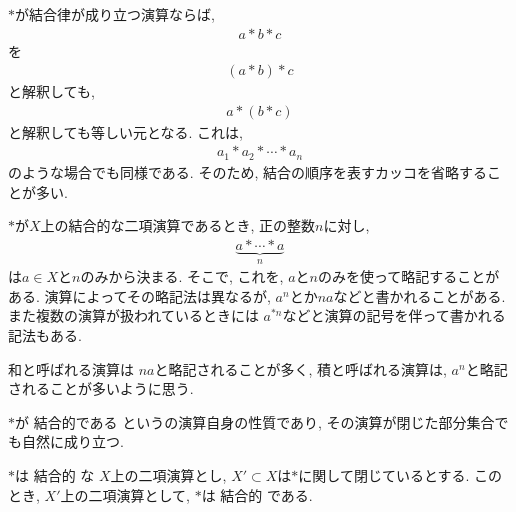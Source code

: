 \begin{remark}
  $\ast$が結合律が成り立つ演算ならば,
  \begin{align*}
    a\ast b \ast c
  \end{align*}
  を
  \begin{align*}
    (a\ast b) \ast c
  \end{align*}
  と解釈しても,
  \begin{align*}
    a\ast (b \ast c)
  \end{align*}
  と解釈しても等しい元となる.
  これは,
  \begin{align*}
    a_1\ast a_2 \ast \cdots \ast a_n
  \end{align*}
  のような場合でも同様である.
  そのため,
  結合の順序を表すカッコを省略することが多い.
\end{remark}
\begin{remark}
  $\ast$が$X$上の結合的な二項演算であるとき,
  正の整数$n$に対し,
  \begin{align*}
    \underbrace{a\ast \cdots \ast a}_{n}
  \end{align*}
  は$a\in X$と$n$のみから決まる.
  そこで, これを, $a$と$n$のみを使って略記することがある.
  演算によってその略記法は異なるが,
  $a^n$とか$na$などと書かれることがある.
  また複数の演算が扱われているときには
  $a^{\ast n}$などと演算の記号を伴って書かれる記法もある.

  和と呼ばれる演算は
  $na$と略記されることが多く,
  積と呼ばれる演算は,
  $a^n$と略記されることが多いように思う.
\end{remark}

$\ast$が
結合的である
というの演算自身の性質であり,
その演算が閉じた部分集合でも自然に成り立つ.
\begin{prop}
  $\ast$は
  結合的
  な
  $X$上の二項演算とし,
  $X'\subset X$は$\ast$に関して閉じているとする.
  このとき,
  $X'$上の二項演算として,
  $\ast$は
  結合的
  である.
\end{prop}

